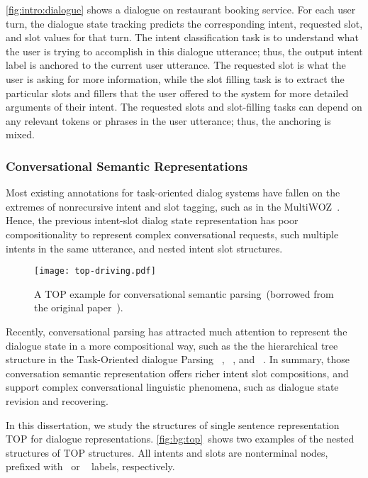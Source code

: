 \autoref{fig:intro:dialogue} shows a dialogue on restaurant booking
service. For each user turn, the dialogue state tracking predicts the
corresponding intent, requested slot, and slot values for that
turn. The intent classification task is to understand what the user is
trying to accomplish in this dialogue utterance; thus, the output
intent label is anchored to the current user utterance. The requested
slot is what the user is asking for more information, while the slot
filling task is to extract the particular slots and fillers that the
user offered to the system for more detailed arguments of their
intent. The requested slots and slot-filling tasks can depend on any
relevant tokens or phrases in the user utterance; thus, the anchoring
is mixed.

\subsubsection{Conversational Semantic Representations}
\label{ssec:bg:dialogue-rep}
Most existing annotations for task-oriented dialog systems have fallen
on the extremes of nonrecursive intent and slot tagging, such as in
the MultiWOZ~\citep{budzianowski2018multiwoz}. Hence, the previous
intent-slot dialog state representation has poor compositionality to
represent complex conversational requests, such multiple intents in the
same utterance, and nested intent slot structures.

\begin{figure}[!tbp]
\centering
\texttt{[image: top-driving.pdf]}
\caption{\label{fig:bg:top} A TOP example for conversational
  semantic parsing~(borrowed from the original
  paper~\citep{gupta-etal-2018-semantic-parsing}).}
\end{figure}
Recently, conversational parsing has attracted much attention to
represent the dialogue state in a more compositional way, such as the
the hierarchical tree structure in the Task-Oriented dialogue Parsing
~\cite[TOP,][]{gupta-etal-2018-semantic-parsing,aghajanyan2020conversational},
~\cite[TreeDST,][]{cheng2020conversational}, and
~\cite[Dataflow,][]{andreas2020task}. In summary, those conversation
semantic representation offers richer intent slot compositions, and
support complex conversational linguistic phenomena, such as dialogue
state revision and recovering.

In this dissertation, we study the structures of single sentence
representation TOP for dialogue
representations. \autoref{fig:bg:top}~shows two examples of the
nested structures of TOP structures. All intents and slots are
nonterminal nodes, prefixed with ~or
~ labels, respectively.


